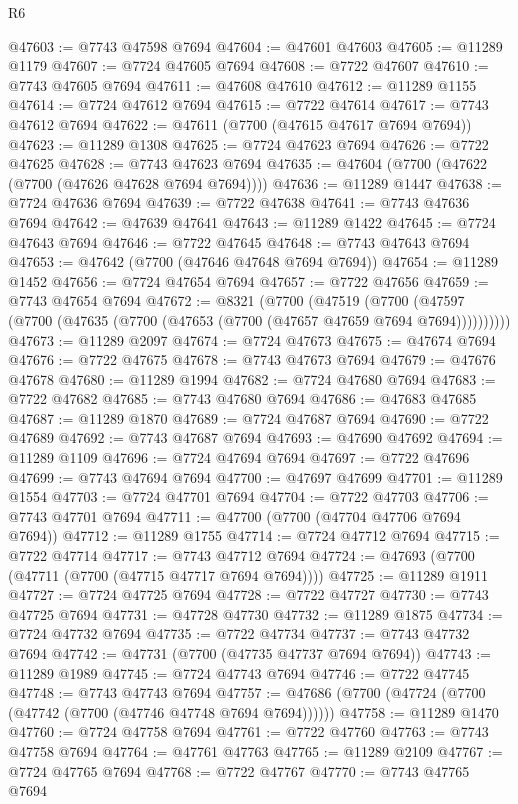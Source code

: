 \begin{lexlean}{R6}
\begin{coremodule}
@47603 := @7743 @47598 @7694
@47604 := @47601 @47603
@47605 := @11289 @1179
@47607 := @7724 @47605 @7694
@47608 := @7722 @47607
@47610 := @7743 @47605 @7694
@47611 := @47608 @47610
@47612 := @11289 @1155
@47614 := @7724 @47612 @7694
@47615 := @7722 @47614
@47617 := @7743 @47612 @7694
@47622 := @47611 (@7700 (@47615 @47617 @7694 @7694))
@47623 := @11289 @1308
@47625 := @7724 @47623 @7694
@47626 := @7722 @47625
@47628 := @7743 @47623 @7694
@47635 := @47604 (@7700 (@47622 (@7700 (@47626 @47628 @7694 @7694))))
@47636 := @11289 @1447
@47638 := @7724 @47636 @7694
@47639 := @7722 @47638
@47641 := @7743 @47636 @7694
@47642 := @47639 @47641
@47643 := @11289 @1422
@47645 := @7724 @47643 @7694
@47646 := @7722 @47645
@47648 := @7743 @47643 @7694
@47653 := @47642 (@7700 (@47646 @47648 @7694 @7694))
@47654 := @11289 @1452
@47656 := @7724 @47654 @7694
@47657 := @7722 @47656
@47659 := @7743 @47654 @7694
@47672 := @8321
    (@7700
      (@47519
        (@7700 (@47597 (@7700 (@47635 (@7700 (@47653 (@7700 (@47657 @47659 @7694 @7694))))))))))
@47673 := @11289 @2097
@47674 := @7724 @47673
@47675 := @47674 @7694
@47676 := @7722 @47675
@47678 := @7743 @47673 @7694
@47679 := @47676 @47678
@47680 := @11289 @1994
@47682 := @7724 @47680 @7694
@47683 := @7722 @47682
@47685 := @7743 @47680 @7694
@47686 := @47683 @47685
@47687 := @11289 @1870
@47689 := @7724 @47687 @7694
@47690 := @7722 @47689
@47692 := @7743 @47687 @7694
@47693 := @47690 @47692
@47694 := @11289 @1109
@47696 := @7724 @47694 @7694
@47697 := @7722 @47696
@47699 := @7743 @47694 @7694
@47700 := @47697 @47699
@47701 := @11289 @1554
@47703 := @7724 @47701 @7694
@47704 := @7722 @47703
@47706 := @7743 @47701 @7694
@47711 := @47700 (@7700 (@47704 @47706 @7694 @7694))
@47712 := @11289 @1755
@47714 := @7724 @47712 @7694
@47715 := @7722 @47714
@47717 := @7743 @47712 @7694
@47724 := @47693 (@7700 (@47711 (@7700 (@47715 @47717 @7694 @7694))))
@47725 := @11289 @1911
@47727 := @7724 @47725 @7694
@47728 := @7722 @47727
@47730 := @7743 @47725 @7694
@47731 := @47728 @47730
@47732 := @11289 @1875
@47734 := @7724 @47732 @7694
@47735 := @7722 @47734
@47737 := @7743 @47732 @7694
@47742 := @47731 (@7700 (@47735 @47737 @7694 @7694))
@47743 := @11289 @1989
@47745 := @7724 @47743 @7694
@47746 := @7722 @47745
@47748 := @7743 @47743 @7694
@47757 := @47686 (@7700 (@47724 (@7700 (@47742 (@7700 (@47746 @47748 @7694 @7694))))))
@47758 := @11289 @1470
@47760 := @7724 @47758 @7694
@47761 := @7722 @47760
@47763 := @7743 @47758 @7694
@47764 := @47761 @47763
@47765 := @11289 @2109
@47767 := @7724 @47765 @7694
@47768 := @7722 @47767
@47770 := @7743 @47765 @7694

\end{coremodule}
\end{lexlean}
